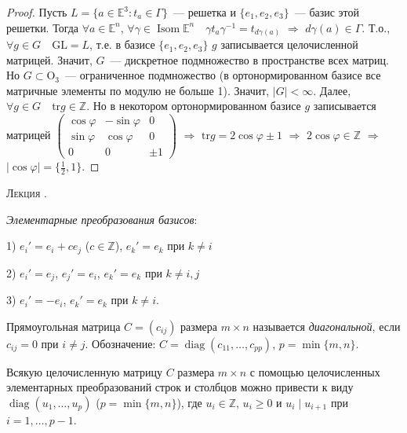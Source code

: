 \documentclass[a4paper]{article}
\newcounter{lec}
\renewcommand{\thelec}{\Roman{lec}}
\newcommand*{\lecture}[1]{\refstepcounter{lec}\vspace{20pt}
\begin{center}{\rmfamily\textsc{Лекция \thelec. \\ \textbf{#1}}}\vspace{5pt}
\end{center}}
\newcommand{\Isom}{\mathop{\mathrm{Isom}}\nolimits}
\newcommand{\diag}{\mathop{\mathrm{diag}}\nolimits}
\begin{document}
\begin{proof}
Пусть $L=\{a\in\mathbb{E}^3:t_a\in\Gamma\}$~--- решетка и
$\{e_1,e_2,e_3\}$~--- базис этой решетки. Тогда $\forall
a\in\mathbb{E}^n$, $\forall \gamma\in\Isom\mathbb{E}^n\quad \gamma
t_a\gamma^{-1}=t_{d\gamma(a)}$ $\Rightarrow$ $d\gamma(a)\in\Gamma$.
Т.о., $\forall g\in G\quad \mathrm{GL}=L$, т.е. в базисе
$\{e_1,e_2,e_3\}$ $g$ записывается целочисленной матрицей. Значит,
$G$~--- дискретное подмножество в пространстве всех матриц. Но
$G\subset\mathrm{O}_3$~--- ограниченное подмножество (в
ортонормированном базисе все матричные элементы по модулю не больше
1). Значит, $|G|<\infty$. Далее, $\forall g\in G\quad
\mathrm{tr}g\in\mathbb{Z}$. Но в некотором ортонормированном базисе
$g$ записывается матрицей $\left(\begin{smallmatrix}\cos\varphi&
-\sin\varphi& 0\\ \sin\varphi& \cos\varphi& 0\\
0& 0& \pm1\end{smallmatrix}\right)$ $\Rightarrow$
$\mathrm{tr}g=2\cos\varphi\pm 1$ $\Rightarrow$
$2\cos\varphi\in\mathbb{Z}$ $\Rightarrow$ $|\cos\varphi|=\{\frac 12,
1\}$.
\end{proof}
\lecture{}

\emph{Элементарные преобразования базисов}:

1) $e_i'=e_i+ce_j$ ($c\in\mathbb{Z}$), $e_k'=e_k$ при $k\neq i$

2) $e_i'=e_j$, $e_j'=e_i$, $e_k'=e_k$ при $k\neq i,j$

3) $e_i'=-e_i$, $e_k'=e_k$ при $k\neq i$.

Прямоугольная матрица $C=(c_{ij})$ размера $m\times n$ называется
\emph{диагональной}, если $c_{ij}=0$ при $i\neq j$. Обозначение:
$C=\diag(c_{11},\ldots,c_{pp})$, $p=\min\{m,n\}$.

\begin{lemm}
\label{1.V}Всякую целочисленную матрицу $C$ размера $m\times n$ с
помощью целочисленных элементарных преобразований строк и столбцов
можно привести к виду $\diag(u_1,\ldots,u_p)$ ($p=\min\{m,n\}$), где
$u_i\in\mathbb{Z}$, $u_i\geqslant 0$ и $u_i\mid u_{i+1}$ при
$i=1,\ldots,p-1$.
\end{lemm}
\end{document}
